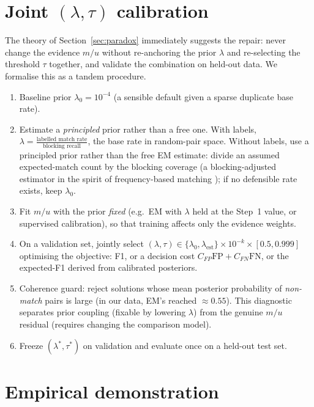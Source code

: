 \documentclass[11pt]{article}
\begin{document}
\section{Joint $(\lambda,\tau)$ calibration}
\label{sec:alg}
The theory of Section~\ref{sec:paradox} immediately suggests the repair: never change the
evidence $m/u$ without re-anchoring the prior $\lambda$ and re-selecting the threshold
$\tau$ together, and validate the combination on held-out data. We formalise this as a
tandem procedure.

\begin{enumerate}
\item[\textbf{Step 0.}] Baseline prior $\lambda_0=10^{-4}$ (a sensible default given a
sparse duplicate base rate).
\item[\textbf{Step 1.}] Estimate a \emph{principled} prior rather than a free one. With
labels, $\lambda=\tfrac{\text{labelled match rate}}{\text{blocking recall}}$, the base rate
in random-pair space. Without labels, use a principled prior rather than the free EM estimate: divide an
assumed expected-match count by the blocking coverage (a blocking-adjusted estimator in the
spirit of frequency-based matching \cite{winkler2000});
if no defensible rate exists, keep $\lambda_0$.
\item[\textbf{Step 2.}] Fit $m/u$ with the prior \emph{fixed} (e.g.\ EM with
${\lambda}$ held at the Step~1 value, or supervised calibration), so that training affects
only the evidence weights.
\item[\textbf{Step 3.}] On a validation set, jointly select
$(\lambda,\tau)\in\{\lambda_0,\lambda_\mathrm{est}\}\times 10^{-k}\times[0.5,0.999]$
optimising the objective: F1, or a decision cost $C_{FP}\mathrm{FP}+C_{FN}\mathrm{FN}$, or
the expected-F1 derived from calibrated posteriors.
\item[\textbf{Step 4.}] Coherence guard: reject solutions whose mean posterior probability
of \emph{non-match} pairs is large (in our data, EM's reached $\approx 0.55$). This
diagnostic separates prior coupling (fixable by lowering $\lambda$) from the genuine
$m/u$ residual (requires changing the comparison model).
\item[\textbf{Step 5.}] Freeze $(\lambda^*,\tau^*)$ on validation and evaluate once on a
held-out test set.
\end{enumerate}

\section{Empirical demonstration}
\label{sec:emp}
\end{document}
